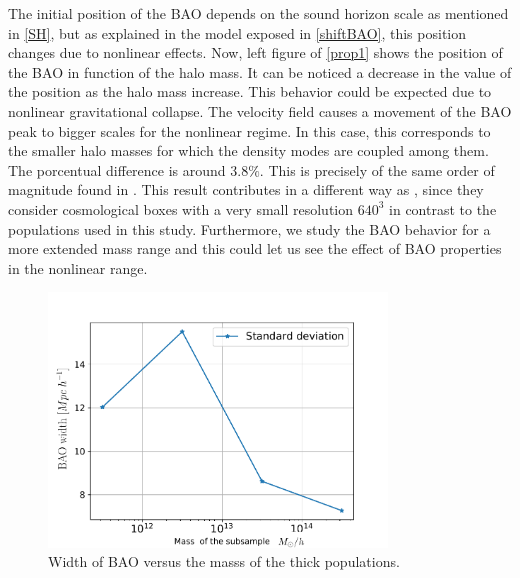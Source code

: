 The initial position of the BAO depends on the sound horizon scale as mentioned in \ref{SH},
but as explained in the model exposed in \ref{shiftBAO}, this position changes due to
nonlinear effects. Now, left figure of \ref{prop1} shows the position of the 
BAO in function of the halo mass. It can be noticed a decrease in the value of the position
as the halo mass increase. This behavior could be expected due to nonlinear gravitational 
collapse. The velocity field causes a movement of the BAO peak to bigger scales 
for the nonlinear regime. In this case, this corresponds to the 
smaller halo masses for which the density modes are coupled among them. 
The porcentual difference is around $3.8\%$. This is
precisely of the same order of magnitude found in \cite{motion}. This result contributes 
in a different way as \cite{motion}, since they consider cosmological boxes with a very
small resolution $640^3$ in contrast to the populations used in this study. Furthermore,
we study the BAO behavior for a more extended mass range and this could let us see 
the effect of BAO properties in the nonlinear range. 

\begin{figure}[htbp]
       \centering

    \includegraphics[width=90mm]{Images/chapter4/Width_vs_Mh.pdf}
\caption{\small Width of BAO versus the masss of the thick populations.}
       \label{sigm1}
 \end{figure}

